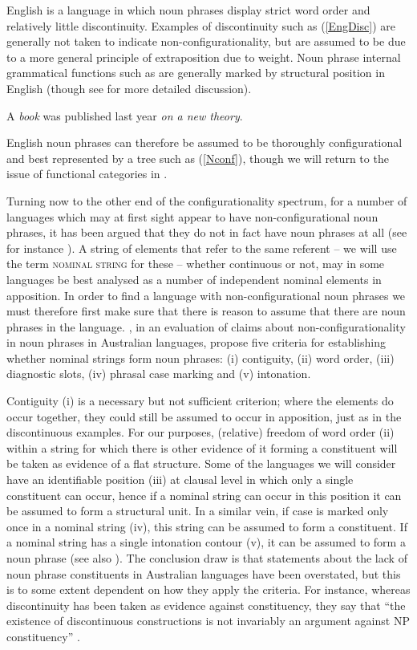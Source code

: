\documentclass[output=paper,hidelinks]{langscibook}
\begin{document}
English is a language in which noun phrases display strict word order and relatively little discontinuity. Examples of discontinuity such as (\ref{EngDisc}) are generally not taken to indicate non-configurationality, but are assumed to be due to a more general principle of extraposition due to weight. Noun phrase internal grammatical functions such as {\POSS} are generally marked by structural position in English (though see  for more detailed discussion).

\ea \label{EngDisc}
A \emph{book} was published last year \emph{on a new theory}.
\z

\noindent English noun phrases can therefore be assumed to be thoroughly configurational and best represented by a tree such as (\ref{Nconf}), though we will return to the issue of functional categories in .

Turning now to the other end of the configurationality spectrum, for a number of languages which may at first sight appear to have non-configurational noun phrases, it has been argued that they do not in fact have noun phrases at all (see for instance \cite{Blake83}). A string of elements that refer to the same referent -- we will use the term \textsc{nominal string} for these -- whether continuous or not, may in some languages be best analysed as a number of independent nominal elements in apposition. In order to find a language with non-configurational noun phrases we must therefore first make sure that there is reason to assume that there are noun phrases in the language. \citet{LouaVers16}, in an evaluation of claims about non-configurationality in noun phrases in Australian languages, propose five criteria for establishing whether nominal strings form noun phrases: (i) contiguity, (ii) word order, (iii) diagnostic slots, (iv) phrasal case marking and (v) intonation. 

Contiguity (i) is a necessary but not sufficient criterion; where the elements do occur together, they could still be assumed to occur in apposition, just as in the discontinuous examples. For our purposes, (relative) freedom of word order (ii) within a string for which there is other evidence of it forming a constituent will be taken as evidence of a flat structure. Some of the languages we will consider have an identifiable position (iii) at clausal level in which only a single constituent can occur, hence if a nominal string can occur in this position it can be assumed to form a structural unit. In a similar vein, if case is marked only once in a nominal string (iv), this string can be assumed to form a constituent. If a nominal string has a single intonation contour (v), it can be assumed to form a noun phrase (see also \citealt{SchuSima12}).  The conclusion \citeauthor{LouaVers16} draw is that statements about the lack of noun phrase constituents in Australian languages have been overstated, but this is to some extent dependent on how they apply the criteria. For instance, whereas discontinuity has been taken as evidence against constituency, they say that ``the existence of discontinuous constructions is not invariably an argument against NP constituency'' \citeyearpar[28]{LouaVers16}. 
\end{document}
